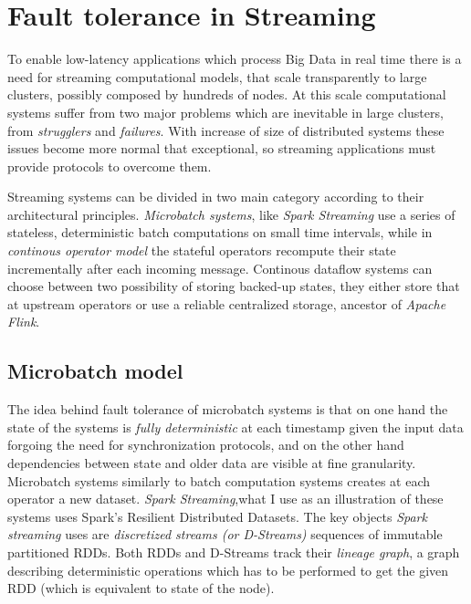 \section{Fault tolerance in Streaming}\label{ft}


To enable low-latency applications which process Big Data in real time there is a need for streaming computational models, that scale transparently to large clusters, possibly composed by hundreds of nodes. At this scale computational systems suffer from two major problems which are inevitable in large clusters, from \textit{strugglers} and \textit{failures}. With increase of size of distributed systems these issues become more normal that exceptional, so streaming applications must provide protocols to overcome them.

Streaming systems can be divided in two main category according to their architectural principles. \textit{Microbatch systems}, like \textit{Spark Streaming} \cite{discretizedstreams} use a series of stateless, deterministic batch computations on small time intervals, while in \textit{continous operator model} the stateful operators recompute their state incrementally after each incoming message. Continous dataflow systems can choose between two possibility of storing backed-up states, they either store that at upstream operators\cite{mapreduceonline}\cite{storm} or use a reliable centralized storage\cite{millwheel}\cite{stratosphere}, ancestor of \textit{Apache Flink}. 
\subsection{Microbatch model}


The idea behind fault tolerance of microbatch systems is that on one hand the state of the systems is \textit{fully deterministic} at each timestamp given the input data forgoing the need for synchronization protocols, and on the other hand dependencies between state and older data are visible at fine granularity. Microbatch systems similarly to batch computation systems creates at each operator a new dataset.  \textit{Spark Streaming},what I use as an illustration of these systems uses  Spark's Resilient Distributed Datasets\cite{rdd}. The key objects \textit{Spark streaming} uses are \textit{discretized streams (or D-Streams)} sequences of immutable partitioned RDDs. Both RDDs and D-Streams track their \textit{lineage graph}, a graph describing deterministic operations which has to be performed to get the given RDD (which is equivalent to state of the node).

